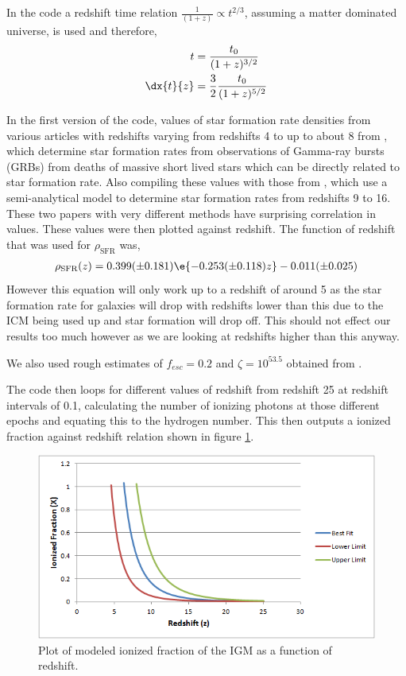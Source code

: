 	In the code a redshift time relation $\frac{1}{(1+z)}\propto t^{2/3}$, assuming a matter dominated universe, is used and therefore,
	\begin{align}
		t &= \frac{t_{0}}{(1+z)^{3/2}} \\
		\dx{t}{z} &= \frac{3}{2}\frac{t_{0}}{(1+z)^{5/2}}
	\end{align}

	In the first version of the code, values of star formation rate densities from  various articles with redshifts varying from redshifts 4 to up to about 8 from \cite{2010MNRAS.401.2561W}, which determine star formation rates from observations of Gamma-ray bursts (GRBs) from deaths of massive short lived stars which can be directly related to star formation rate. Also compiling these values with those from \cite{2012ApJ...759L..38A}, which use a semi-analytical model to determine star formation rates from redshifts 9 to 16. These two papers with very different methods have surprising correlation in values.
	These values were then plotted against redshift. The function of redshift that was used for $\rho_\text{SFR}$ was,
	\begin{align}
		\rho_\text{SFR}(z)=0.399(\pm0.181)\e{-0.253(\pm0.118)z}-0.011(\pm0.025)
	\end{align}
	However this equation will only work up to a redshift of around 5 as the star formation rate for galaxies will drop with redshifts lower than this due to the ICM being used up and star formation will drop off. This should not effect our results too much however as we are looking at redshifts higher than this anyway.

	We also used rough estimates of $f_{esc}=0.2$ and $\zeta=10^{53.5}$ obtained from \cite{2010Natur.468...49R}.

	The code then loops for different values of redshift from redshift 25 at redshift intervals of 0.1, calculating the number of ionizing photons at those different epochs and equating this to the hydrogen number. This then outputs a ionized fraction against redshift relation shown in figure \ref{fig:IonizedFraction1}.
	\begin{figure}
		\centering
			\includegraphics{../Images/IonizedFraction1.png}
			\caption{Plot of modeled ionized fraction of the IGM as a function of redshift.\label{fig:IonizedFraction1}}
	\end{figure}

